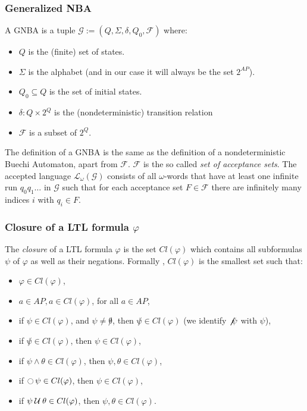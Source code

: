 \documentclass{article}
\begin{document}
\subsubsection*{Generalized NBA}
A GNBA is a tuple $\mathcal{G} := (Q, \Sigma, \delta, Q_0, \mathcal{F})$ where:
\begin{itemize}
    \item $Q$ is the (finite) set of states.
    \item $\Sigma$ is the alphabet (and in our case it will always be the set $2^{AP}$).
    \item $Q_0 \subseteq Q$ is the set of initial states.
    \item $\delta : Q \times 2^{Q}$ is the (nondeterministic) transition relation 
    \item $\mathcal{F}$ is a subset of $2^{Q}$.
\end{itemize}
The definition of a GNBA is the same as the definition of a nondeterministic Buechi Automaton, apart from $\mathcal{F}$.
$\mathcal{F}$ is the so called \emph{set of acceptance sets}. The accepted language $\mathcal{L}_{\omega}(\mathcal{G})$
consists of all $\omega$-words that have at least one infinite run $q_0q_1 \dots$ in $\mathcal{G}$ such that 
for each acceptance set $F \in \mathcal{F}$ there are infinitely many indices $i$ with $q_i \in F$.

\subsubsection*{Closure of a LTL formula $\varphi$}
The \emph{closure} of a LTL formula $\varphi$ is the set $Cl(\varphi)$ which contains all subformulas $\psi$ 
of $\varphi$ as well as their negations. Formally , $Cl(\varphi)$ is the smallest set such that: 
\begin{itemize}
    \item $\varphi \in Cl(\varphi)$,
    \item $a \in AP, a \in Cl(\varphi)$, for all $a \in AP$,
    \item if $\psi \in Cl(\varphi)$, and $\psi \neq \not \theta$, then $\not \psi \in Cl(\varphi)$ (we identify $\not \not \psi$ with $\psi$),
    \item if $\not \psi \in Cl(\varphi)$, then $\psi \in Cl(\varphi)$,
    \item if $\psi \land \theta \in Cl(\varphi)$, then $\psi, \theta \in Cl(\varphi)$,
    \item if $\mathop{\ocircle}{\psi} \in Cl(\varphi)$, then $\psi \in Cl(\varphi)$,
    \item if $\psi \mathbin{\mathcal{U}} \theta \in Cl(\varphi)$, then $\psi, \theta \in Cl(\varphi)$.
\end{itemize}
\end{document}
